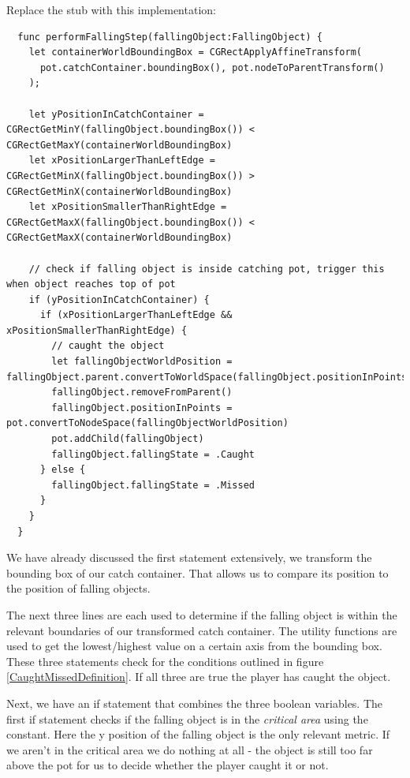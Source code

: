 \begin{leftbar}
Replace the  stub with this implementation:
\begin{lstlisting}
  func performFallingStep(fallingObject:FallingObject) {
    let containerWorldBoundingBox = CGRectApplyAffineTransform(
      pot.catchContainer.boundingBox(), pot.nodeToParentTransform()
    );
    
    let yPositionInCatchContainer = CGRectGetMinY(fallingObject.boundingBox()) < CGRectGetMaxY(containerWorldBoundingBox)
    let xPositionLargerThanLeftEdge = CGRectGetMinX(fallingObject.boundingBox()) > CGRectGetMinX(containerWorldBoundingBox)
    let xPositionSmallerThanRightEdge = CGRectGetMaxX(fallingObject.boundingBox()) < CGRectGetMaxX(containerWorldBoundingBox)
    
    // check if falling object is inside catching pot, trigger this when object reaches top of pot
    if (yPositionInCatchContainer) {
      if (xPositionLargerThanLeftEdge && xPositionSmallerThanRightEdge) {
        // caught the object
        let fallingObjectWorldPosition = fallingObject.parent.convertToWorldSpace(fallingObject.positionInPoints)
        fallingObject.removeFromParent()
        fallingObject.positionInPoints = pot.convertToNodeSpace(fallingObjectWorldPosition)
        pot.addChild(fallingObject)
        fallingObject.fallingState = .Caught
      } else {
        fallingObject.fallingState = .Missed
      }
    }
  }

\end{lstlisting}
\end{leftbar}

We have already discussed the first statement extensively, we transform the
bounding box of our catch container. That allows us to compare its position to
the position of falling objects. 

The next three lines are each used to
determine if the falling object is within the relevant boundaries of our transformed catch container. The
 utility functions are used to get the
lowest/highest value on a certain axis from the bounding box. These three
statements check for the conditions outlined in figure
\ref{CaughtMissedDefinition}. If all three are true the player has caught the
object.

Next, we have an if statement that combines the three boolean variables. The
first if statement checks if the falling object is in the
\textit{critical area} using the 
constant. Here the y position of the falling object is the only relevant metric.
If we aren't in the critical area we do nothing at all - the object is still too
far above the pot for us to decide whether the player caught it or not.

